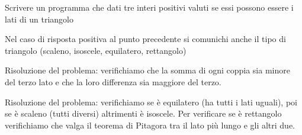 \begin{Exercise}[label={ex:triangolo}]
		\Question Scrivere un programma che dati tre interi positivi valuti se essi possono essere i lati di un triangolo

		\Question Nel caso di risposta positiva al punto precedente si comunichi anche il tipo di triangolo (scaleno, isoscele, equilatero, rettangolo)
\end{Exercise}

\begin{Answer}[ref={ex:triangolo}]
		Risoluzione del problema: verifichiamo che la somma di ogni coppia sia minore del terzo lato e che la loro differenza sia maggiore del terzo.
		
    

		Risoluzione del problema: verifichiamo se \`e equilatero (ha tutti i lati uguali), poi se \`e scaleno (tutti diversi) altrimenti \`e isoscele. Per verificare se \`e rettangolo verifichiamo che valga il teorema di Pitagora tra il lato pi\`u lungo e gli altri due.
		
    

\end{Answer}